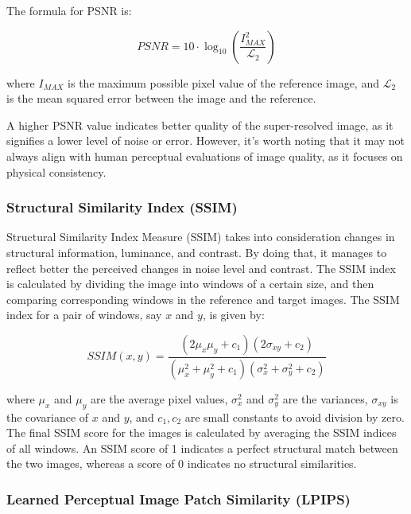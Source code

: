             The formula for PSNR is:
            
            \begin{equation}
            PSNR = 10 \cdot \log_{10} \left( \frac{I_{MAX}^{2}}{\mathcal{L}_2} \right)
            \end{equation}
            
            where $I_{MAX}$ is the maximum possible pixel value of the reference image, and $\mathcal{L}_2$ is the mean squared error between the image and the reference.
            
            A higher PSNR value indicates better quality of the super-resolved image, as it signifies a lower level of noise or error. However, it's worth noting that it may not always align with human perceptual evaluations of image quality, as it focuses on physical consistency.

        \subsubsection{Structural Similarity Index (SSIM)}

            
        Structural Similarity Index Measure (SSIM) takes into consideration changes in structural information, luminance, and contrast. By doing that, it manages to reflect better the perceived changes in noise level and contrast.
        The SSIM index is calculated by dividing the image into windows of a certain size, and then comparing corresponding windows in the reference and target images. The SSIM index for a pair of windows, say $x$ and $y$, is given by:
        
        \begin{equation}
            SSIM(x, y) = \frac{(2\mu_x\mu_y + c_1)(2\sigma_{xy} + c_2)}{(\mu_x^2 + \mu_y^2 + c_1)(\sigma_x^2 + \sigma_y^2 + c_2)}
        \end{equation}
        
        where $\mu_x$ and $\mu_y$ are the average pixel values, $\sigma_x^2$ and $\sigma_y^2$ are the variances, $\sigma_{xy}$ is the covariance of $x$ and $y$, and $c_1, c_2$ are small constants to avoid division by zero.
        The final SSIM score for the images is calculated by averaging the SSIM indices of all windows. An SSIM score of 1 indicates a perfect structural match between the two images, whereas a score of 0 indicates no structural similarities.

        \subsubsection{Learned Perceptual Image Patch Similarity (LPIPS)}

